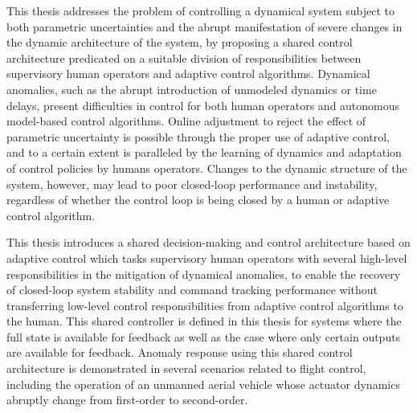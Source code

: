 % 
% 
%

This thesis addresses the problem of controlling a dynamical system subject to both parametric uncertainties and the abrupt manifestation of severe changes in the dynamic architecture of the system, by proposing a shared control architecture predicated on a suitable division of responsibilities between supervisory human operators and adaptive control algorithms. Dynamical anomalies, such as the abrupt introduction of unmodeled dynamics or time delays, present difficulties in control for both human operators and autonomous model-based control algorithms. Online adjustment to reject the effect of parametric uncertainty is possible through the proper use of adaptive control, and to a certain extent is paralleled by the learning of dynamics and adaptation of control policies by humans operators. Changes to the dynamic structure of the system, however, may lead to poor closed-loop performance and instability, regardless of whether the control loop is being closed by a human or adaptive control algorithm.

This thesis introduces a shared decision-making and control architecture based on adaptive control which tasks supervisory human operators with several high-level responsibilities in the mitigation of dynamical anomalies, to enable the recovery of closed-loop system stability and command tracking performance without transferring low-level control responsibilities from adaptive control algorithms to the human. This shared controller is defined in this thesis for systems where the full state is available for feedback as well as the case where only certain outputs are available for feedback. Anomaly response using this shared control architecture is demonstrated in several scenarios related to flight control, including the operation of an unmanned aerial vehicle whose actuator dynamics abruptly change from first-order to second-order. 